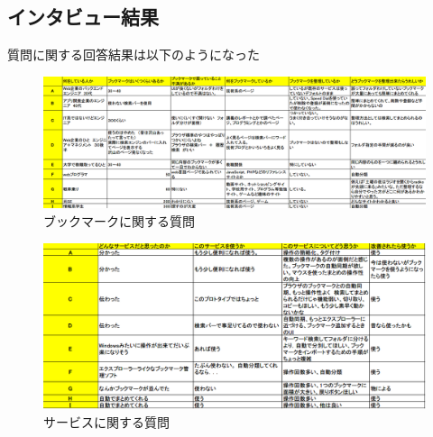 \documentclass[a4paper,10pt,fleqn]{jsarticle}
\begin{document}
\subsection{インタビュー結果}
質問に関する回答結果は以下のようになった

\begin{figure}[htbp]
  \begin{center}
    \includegraphics[width=14cm]{./interview-res-1.png}
    \caption{ブックマークに関する質問}
  \end{center}
\end{figure}
\begin{figure}[htbp]
  \begin{center}
    \includegraphics[width=14cm]{./interview-res-2.png}
    \caption{サービスに関する質問}
  \end{center}
\end{figure}
\end{document}

